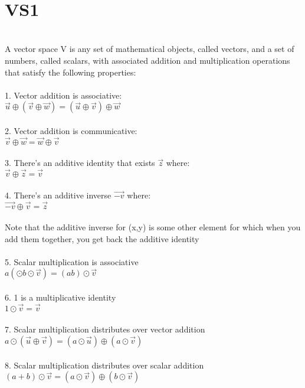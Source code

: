 \documentclass{article}
\begin{document}
\\
\tableofcontents
\newpage
\section{VS1}\\

A vector space V is any set of mathematical objects, called vectors, and a set of numbers, called scalars, with associated addition and multiplication operations that satisfy the following properties:\\
\\
1. Vector addition is associative:\\
$\vec{u}\oplus(\vec{v}\oplus\vec{w}) = (\vec{u}\oplus\vec{v})\oplus\vec{w}$\\
\\
2. Vector addition is communicative:\\
$\vec{v}\oplus\vec{w} = \vec{w}\oplus\vec{v}$\\
\\
3. There's an additive identity that exists $\vec{z}$ where:\\
$\vec{v}\oplus\vec{z}=\vec{v}$\\
\\
4. There's an additive inverse $\vec{-v}$ where:\\
$\vec{-v}\oplus\vec{v}=\vec{z}$\\
\\
Note that the additive inverse for (x,y) is some other element for which when you add them together, you get back the additive identity \\
\\
5. Scalar multiplication is associative\\
${a}(\odot{b}\odot\vec{v}) = (ab)\odot\vec{v}$\\
\\
6. 1 is a multiplicative identity\\
${1}\odot\vec{v} = \vec{v}$\\
\\
7. Scalar multiplication distributes over vector addition\\
${a}\odot(\vec{u}\oplus\vec{v}) = ({a}\odot\vec{u})\oplus({a}\odot\vec{v})$\\
\\
8. Scalar multiplication distributes over scalar addition \\
$(a+b)\odot\vec{v} = (a\odot\vec{v})\oplus(b\odot\vec{v})$\\
\newpage
\end{document}
